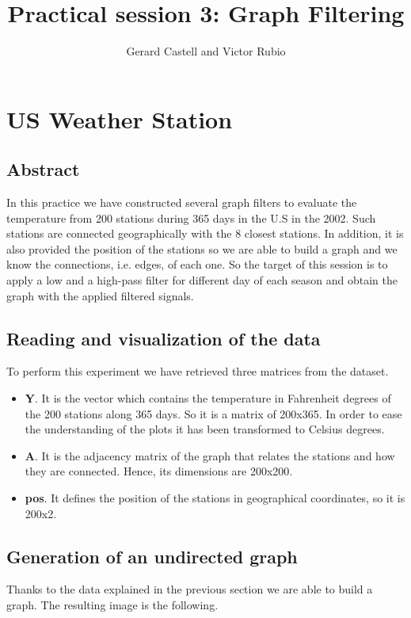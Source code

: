 \documentclass[12pt]{article}
\title{Practical session 3: Graph Filtering}
\author{Gerard Castell and Victor Rubio}
\begin{document}
\maketitle

\thispagestyle{fancyplain}
\flushleft 


\Large
\hspace{10pt}
\small
\section{US Weather Station}

\subsection{Abstract}
\justifying
In this practice we have constructed several graph filters to evaluate the temperature from 200 stations during 365 days in the U.S in the 2002. Such stations are connected geographically with the 8 closest stations. In addition, it is also provided the position of the stations so we are able to build a graph and we know the connections, i.e. edges, of each one. So the target of this session is to apply a low and a high-pass filter for different day of each season and obtain the graph with the applied filtered signals.
\subsection{Reading and visualization of the data}
\justifying
To perform this experiment we have retrieved three matrices from the dataset.
\begin{itemize}
    \item \textbf{Y}. It is the vector which contains the temperature in Fahrenheit degrees of the 200 stations along 365 days. So it is a matrix of 200x365. In order to ease the understanding of the plots it has been transformed to Celsius degrees.
    \item \textbf{A}. It is the adjacency matrix of the graph that relates the stations and how they are connected. Hence, its dimensions are 200x200.
     \item \textbf{pos}. It defines the position of the stations in geographical coordinates, so it is 200x2.
\end{itemize}


\subsection{Generation of an undirected graph}
\justifying Thanks to the data explained in the previous section we are able to build a graph. The resulting image is the following.
\end{document}
